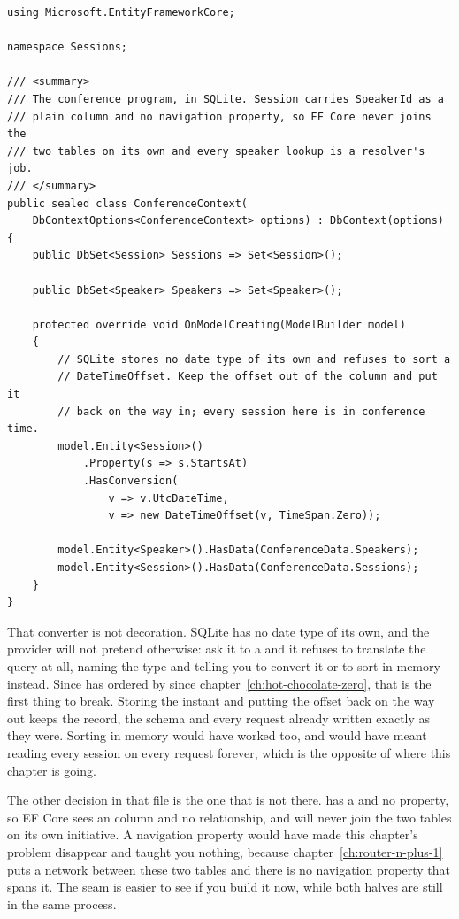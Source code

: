 \begin{verbatim}
using Microsoft.EntityFrameworkCore;

namespace Sessions;

/// <summary>
/// The conference program, in SQLite. Session carries SpeakerId as a
/// plain column and no navigation property, so EF Core never joins the
/// two tables on its own and every speaker lookup is a resolver's job.
/// </summary>
public sealed class ConferenceContext(
    DbContextOptions<ConferenceContext> options) : DbContext(options)
{
    public DbSet<Session> Sessions => Set<Session>();

    public DbSet<Speaker> Speakers => Set<Speaker>();

    protected override void OnModelCreating(ModelBuilder model)
    {
        // SQLite stores no date type of its own and refuses to sort a
        // DateTimeOffset. Keep the offset out of the column and put it
        // back on the way in; every session here is in conference time.
        model.Entity<Session>()
            .Property(s => s.StartsAt)
            .HasConversion(
                v => v.UtcDateTime,
                v => new DateTimeOffset(v, TimeSpan.Zero));

        model.Entity<Speaker>().HasData(ConferenceData.Speakers);
        model.Entity<Session>().HasData(ConferenceData.Sessions);
    }
}
\end{verbatim}

%
%
That converter is not decoration. SQLite has no date type of its own, and the
provider will not pretend otherwise: ask it to  a
 and it refuses to translate the query at all, naming the
type and telling you to convert it or to sort in memory instead. Since
 has ordered by  since
chapter~\ref{ch:hot-chocolate-zero}, that is the first thing to break. Storing
the instant and putting the offset back on the way out keeps the record, the
schema and every request already written exactly as they were. Sorting in
memory would have worked too, and would have meant reading every session on
every request forever, which is the opposite of where this chapter is going.

%
The other decision in that file is the one that is not there. 
has a  and no  property, so EF Core sees an
 column and no relationship, and will never join the two tables on
its own initiative. A navigation property would have made this chapter's
problem disappear and taught you nothing, because
chapter~\ref{ch:router-n-plus-1} puts a network between these two tables and
there is no navigation property that spans it. The seam is easier to see if you
build it now, while both halves are still in the same process.

